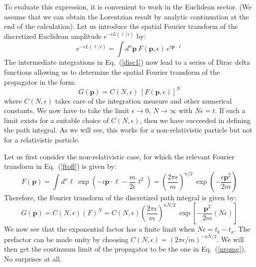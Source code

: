 \documentclass[12pt]{article}
\def\eq#1{{Eq.~(\ref{#1})}}
\def\frab#1#2{\left(\frac{#1}{#2}\right)}
\begin{document}
To evaluate this expression, it is convenient to work in the Euclidean sector. (We assume that we can obtain the Lorentzian result by analytic continuation at the end of the calculation). Let us introduce the spatial Fourier transform of the discretized Euclidean amplitude $e^{-\epsilon L(\bm{\ell}/\epsilon)}$ by:
\begin{equation}
 e^{-\epsilon L(\bm{\ell}/\epsilon)} = \int d^n \bm{p}\ F(\bm{p},\epsilon)\, e^{i{\bm{p\cdot \ell}}}
 \label{ftofl}
\end{equation}
The intermediate integrations in \eq{disc1} now lead to a series of Dirac delta functions allowing us to determine the spatial Fourier transform of the propagator in the form:
\begin{equation}
 G(\bm{p}) = C(N,\epsilon)\ \left[ F(\bm{p},\epsilon)\right]^{N}
 \label{gengofp}
\end{equation} 
where $C(N,\epsilon)$ takes care of the integration measure and other numerical constants.
  We now have to take the limit $\epsilon\to 0$, $N\to \infty$ with $N\epsilon =t$. If such a limit exists for a suitable choice of $C(N,\epsilon)$, then we have succeeded in defining the path integral. As we will see, this works for a non-relativistic particle but not for a relativistic particle.

 Let us first consider the non-relativistic case, for which the relevant Fourier transform in \eq{ftofl} is given by:
\begin{equation}
 F(\bm{p})= \int d^n\bm{\ell}\ \exp\left(-i\bm{p\cdot \ell} - \frac{m}{2\epsilon} \bm{\ell}^2\right) = \frab{2\pi \epsilon}{m}^{n/2} \ \exp\left(-\frac{\epsilon \bm{p}^2}{2m}\right)
 \label{fofpnr}
\end{equation} 
Therefore, the Fourier transform of the discretized path integral is given by:
\begin{equation}
  G(\bm{p}) =C(N,\epsilon) (F)^{N} = C(N,\epsilon)\frab{2\pi \epsilon}{m}^{nN/2} \ \exp\left[-\frac{\bm{p}^2}{2m} (N \epsilon)\right]
\end{equation} 
We now see that the exponential factor has a finite limit when $N \epsilon = t_b-t_a$. The prefactor can be made unity by choosing $C(N,\epsilon)=(2\pi \epsilon/m)^{-nN/2} $. We will then get the continuum limit of the propagator to be the one in \eq{nrqmg}. No surprises at all.
\end{document}
